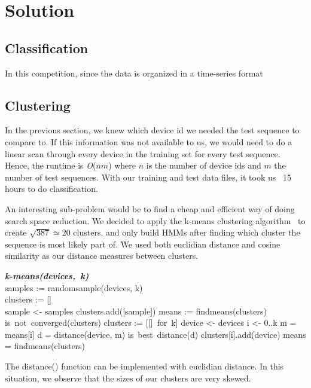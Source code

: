 \section{Solution}

\subsection{Classification}
In this competition, since the data is organized in a time-series format

\subsection{Clustering}
In the previous section, we knew which device id we needed the test sequence
to compare to. If this information was not available to us, we would need
to do a linear scan through every device in the training set for every
test sequence. Hence, the runtime is \textit{O}($nm$) where $n$ is the
number of device ids and $m$ the number of test sequences. With our 
training and test data files, it took us ~15 hours to do classification.

An interesting sub-problem would be to find a cheap and efficient way of
doing search space reduction. We decided to apply the k-means clustering
algorithm~\cite{kmeans} to create $\sqrt{387} \simeq 20$ clusters, and only build HMMs
after finding which cluster the sequence is most likely part of. We used both
euclidian distance and cosine similarity as our distance measures between
clusters.

\begin{program}
\mbox{\textit{\textbf{k-means(devices, k)}}}
\BEGIN \\
  samples := randomsample(devices, k) \\
  clusters := [] \\
  \FOR sample <- samples \DO
    clusters.add([sample]) \OD
  means := findmeans(clusters) 
  \WHILE is\ not\ converged(clusters) \DO
    clusters := [[]\ for\ k]
    \FOR device <- devices \DO
      \FOR i <- 0..k \DO
        m = means[i]
        d = distance(device, m)
        \IF is\ best\ distance(d)
          clusters[i].add(device)
        \OD
        \OD
    means = findmeans(clusters)
    \OD
\END
\end{program}

The distance() function can be implemented with euclidian distance. In this
situation, we observe that the sizes of our clusters are very skewed.

